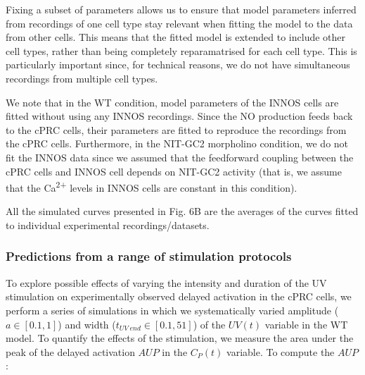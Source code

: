 \documentclass[
  10pt,
  onecolumn]{article}
\begin{document}
Fixing a subset of parameters allows us to ensure that model parameters
inferred from recordings of one cell type stay relevant when fitting the
model to the data from other cells. This means that the fitted model is
extended to include other cell types, rather than being completely
reparamatrised for each cell type. This is particularly important since,
for technical reasons, we do not have simultaneous recordings from
multiple cell types.

We note that in the WT condition, model parameters of the INNOS cells
are fitted without using any INNOS recordings. Since the NO production
feeds back to the cPRC cells, their parameters are fitted to reproduce
the recordings from the cPRC cells. Furthermore, in the NIT-GC2
morpholino condition, we do not fit the INNOS data since we assumed that
the feedforward coupling between the cPRC cells and INNOS cell depends
on NIT-GC2 activity (that is, we assume that the Ca\textsuperscript{2+}
levels in INNOS cells are constant in this condition).

All the simulated curves presented in Fig. 6B are the averages of the
curves fitted to individual experimental recordings/datasets.

\hypertarget{predictions-from-a-range-of-stimulation-protocols}{%
\subsubsection{Predictions from a range of stimulation
protocols}\label{predictions-from-a-range-of-stimulation-protocols}}

To explore possible effects of varying the intensity and duration of the
UV stimulation on experimentally observed delayed activation in the cPRC
cells, we perform a series of simulations in which we systematically
varied amplitude (\(a \in [0.1,1]\)) and width
(\(t_{UV\: end} \in [0.1,51]\)) of the \(UV(t)\) variable in the WT
model. To quantify the effects of the stimulation, we measure the area
under the peak of the delayed activation \(AUP\) in the \(C_P(t)\)
variable. To compute the \(AUP\):
\end{document}
